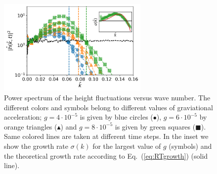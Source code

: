 \begin{figure}
    \centering
    \includegraphics[width=0.65\textwidth]{graphics/Fig_3_new_RTI_spectra_single_color_same_tau_capkc_correct_rescaled_x_axis_inset.png}
    \caption{Power spectrum of the height fluctuations versus wave number. The different colors and symbols belong to different values of graviational acceleration; $g=4\cdot 10^{-5}$ is given by blue circles (\textcolor{pyblue}{$\bullet$}), $g=6\cdot 10^{-5}$ by orange triangles (\textcolor{pyorange}{$\blacktriangle$}) and $g=8\cdot 10^{-5}$ is given by green squares (\textcolor{pygreen}{$\blacksquare$}). Same colored lines are taken at different time steps. In the inset we show the growth rate $\sigma(k)$ for the largest value of $g$ (symbols) and the theoretical growth rate according to Eq.~(\ref{eq:RTgrowth}) (solid line).}
    \label{fig:RTI}
\end{figure}

